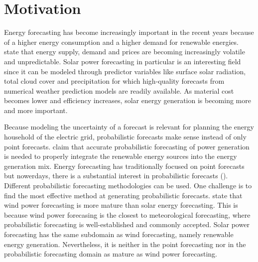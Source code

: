 \section{Motivation}
\label{sec:motivation}


Energy forecasting has become increasingly important in the recent years 
because of a higher energy consumption and a higher demand 
for renewable energies. 
\Textcite{Hong2016} state that energy supply, demand and prices are becoming increasingly 
volatile and unpredictable. 
Solar power forecasting in particular is an interesting field since it can be modeled through predictor variables 
like surface solar radiation, total cloud cover and precipitation 
for which high-quality forecasts from numerical weather prediction models are readily available. 
As material cost becomes lower and efficiency increases, solar energy generation is becoming more and more important. 


Because modeling the uncertainty of a forecast is relevant for planning the energy household of the electric grid, 
probabilistic forecasts make sense instead of only point forecasts. 
\textcite{Meer2018} claim that accurate probabilistic forecasting of power generation is needed to properly 
integrate the renewable energy sources into the energy generation mix. 
Energy forecasting has traditionally focused on point forecasts 
but nowerdays, there is a substantial interest in probabilistic forecasts (\Textcite{Meer2018}).
Different probabilistic forecasting methodologies can be used. 
One challenge is to find the most effective method at generating probabilistic forecasts. 
\Textcite{Hong2016} state that wind power forecasting is 
more mature than solar energy forecasting. This is because 
wind power forecasing is the closest to meteorological forecasting, 
where probabilistic forecasting is well-established and commonly accepted.
Solar power forecasting has the same subdomain as wind forecasting, namely renewable energy generation. 
Nevertheless, it is neither in the 
point forecasting nor in the probabilistic forecasting domain as mature 
as wind power forecasting. 


